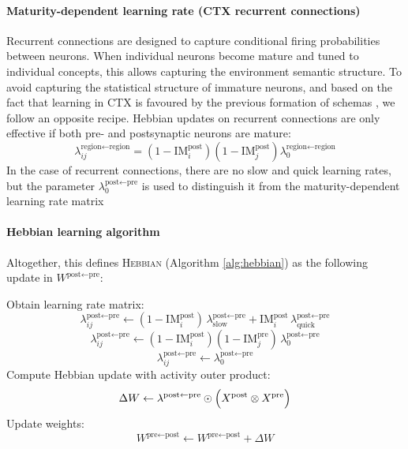 \documentclass{article}
\begin{document}
\paragraph*{Maturity-dependent learning rate (CTX recurrent connections)}
Recurrent connections are designed to capture conditional firing probabilities between neurons. When individual neurons become mature and tuned to individual concepts, this allows capturing the environment semantic structure. To avoid capturing the statistical structure of immature neurons, and based on the fact that learning in CTX is favoured by the previous formation of schemas , we follow an opposite recipe. Hebbian updates on recurrent connections are only effective if both pre- and postsynaptic neurons are mature:
\begin{equation}
    \lambda_{ij}^{\textrm{region} \leftarrow \textrm{region}} = (1 - \textrm{IM}^\textrm{post}_i)(1 - \textrm{IM}^\textrm{post}_j)\lambda^{\textrm{region}\leftarrow\textrm{region}}_0
\end{equation}
In the case of recurrent connections, there are no slow and quick learning rates, but the parameter $\lambda^{\textrm{post}\leftarrow\textrm{pre}}_0$ is used to distinguish it from the maturity-dependent learning rate matrix 
\paragraph*{Hebbian learning algorithm}
Altogether, this defines \textsc{Hebbian} (Algorithm \ref{alg:hebbian}) as the following update in $W^{\textrm{post} \leftarrow \textrm{pre}}$:
\begin{algorithm}
\caption{Hebbian Learning}\label{alg:hebbian}
\begin{algorithmic}[1]
    \State Obtain learning rate matrix:
        \[
            \lambda_{ij}^{\textrm{post} \leftarrow \textrm{pre}}
            \gets
            (1-\textrm{IM}^\textrm{post}_i)\,\lambda^{\textrm{post} \leftarrow \textrm{pre}}_\textrm{slow}
            + \textrm{IM}^\textrm{post}_i\,\lambda^{\textrm{post}\leftarrow\textrm{pre}}_{\textrm{quick}}
        \]
        \[
            \lambda_{ij}^{\textrm{post} \leftarrow \textrm{pre}} 
            \gets 
            (1 - \textrm{IM}^\textrm{post}_i)(1 - \textrm{IM}^\textrm{pre}_j)\,
            \lambda^{\textrm{post}\leftarrow\textrm{pre}}_\textrm{0}
        \]
    \Else
        \[
            \lambda_{ij}^{\textrm{post} \leftarrow \textrm{pre}} 
            \gets 
            \lambda^{\textrm{post}\leftarrow\textrm{pre}}_0
        \]
    \EndIf
    \State Compute Hebbian update with activity outer product:
        \[
            \Delta W \gets \lambda^{\textrm{post} \leftarrow \textrm{pre}} \odot 
            \Bigl(X^{\textrm{post}} \otimes X^{\textrm{pre}}\Bigr)
        \]
    \State Update weights:
        \[
            W^{\textrm{pre} \leftarrow \textrm{post}} 
            \gets 
            W^{\textrm{pre} \leftarrow \textrm{post}} + \Delta W
        \]
\EndFunction
\end{algorithmic}
\end{algorithm}
\end{document}
